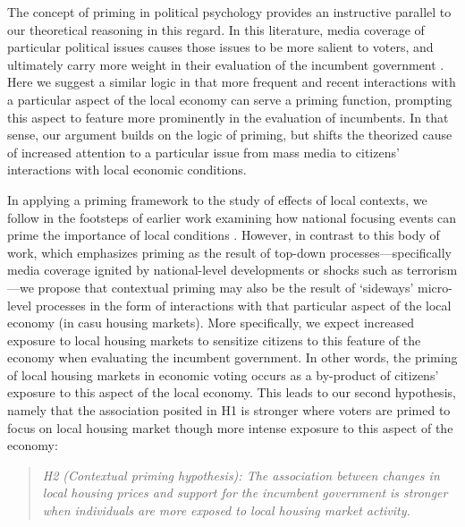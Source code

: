 \documentclass[12pt,a4paper]{article}
\begin{document}
	The concept of priming in political psychology provides an instructive parallel to our theoretical reasoning in this regard. In this literature, media coverage of particular political issues causes those issues to be more salient to voters, and ultimately carry more weight in their evaluation of the incumbent government \citep{iyengar1982experimental,iyengar1987television,krosnick1990altering}. Here we suggest a similar logic in that more frequent and recent interactions with a particular aspect of the local economy can serve a priming function, prompting this aspect to feature more prominently in the evaluation of incumbents. In that sense, our argument builds on the logic of priming, but shifts the theorized cause of increased attention to a particular issue from mass media to citizens’ interactions with local economic conditions. 
	
	In applying a priming framework to the study of effects of local contexts, we follow in the footsteps of earlier work examining how national focusing events can prime the importance of local conditions \citep[e.g.,] []{hopkins2010politicized,legewie2013terrorist}. However, in contrast to this body of work, which emphasizes priming as the result of top-down processes—specifically media coverage ignited by national-level developments or shocks such as terrorism—we propose that contextual priming may also be the result of `sideways’ micro-level processes in the form of interactions with that particular aspect of the local economy (in casu housing markets). More specifically, we expect increased exposure to local housing markets to sensitize citizens to this feature of the economy when evaluating the incumbent government. In other words, the priming of local housing markets in economic voting occurs as a by-product of citizens’ exposure to this aspect of the local economy.
	This leads to our second hypothesis, namely that the association posited in H1 is stronger where voters are primed to focus on local housing market though more intense exposure to this aspect of the economy:
	
	\newcommand{\htwo}{the contextual priming hypothesis}
	
	\begin{quote}
		\textit{H2 (Contextual priming hypothesis): The association between changes in local housing prices and support for the incumbent government is stronger when individuals are more exposed to local housing market activity.}
	\end{quote}
\end{document}
